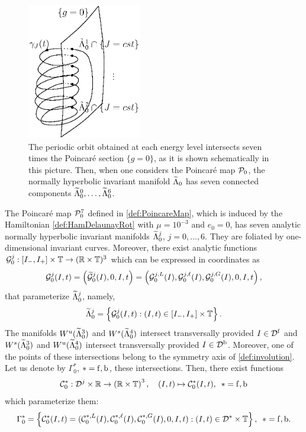 \begin{figure}[h]
  \begin{center}
    \includegraphics[width=5cm]{gammaJ.eps}
  \end{center}
  \caption{The periodic orbit obtained at each energy level intersects seven times the Poincar\'e section $\{g=0\}$, as it is shown schematically in this picture. Then, when one considers the Poincar\'e map $\mathcal{P}_0$, the normally hyperbolic invariant manifold $\widetilde\Lambda_0$ has seven connected components $\widetilde\Lambda^0_0, \ldots, \widetilde\Lambda_0^6$.}
  \label{fig:PoincareSection}
\end{figure}



\begin{corollary}\label{coro:NHIMCircular:Poincare}
  The Poincar\'e map $\mathcal{P}^7_0$ defined in \eqref{def:PoincareMap}, which is 
  induced by the Hamiltonian \eqref{def:HamDelaunayRot} with $\mu=10^{-3}$ 
  and  $e_0=0$, has seven analytic normally hyperbolic invariant manifolds
  $\widetilde\Lambda_0^j$, $j=0,\ldots,6$. They are foliated by one-dimensional 
  invariant curves. Moreover, there exist analytic functions 
  $\mathcal{G}^j_0: [I_-,I_+]\times\mathbb{T}\rightarrow (\mathbb{R} \times \mathbb{T})^3$ which can
  be expressed in coordinates as
  \begin{equation}\label{def:NHIM:Param0}
    \mathcal{G}_0^j(I,t)=\left(\widetilde
      {\mathcal{G}}_0^j(I),0,I,t\right)=\left(\mathcal{G}_0^{j,L}(I),\mathcal{G}_0^{j,\ell}(I),
      \mathcal{G}_0^{j,G}(I),0,I,t\right),
  \end{equation}
  that parameterize $\widetilde \Lambda_0^j$, namely,
  \[
  \widetilde\Lambda^j_0=\left\{ \mathcal{G}_0^j(I,t):(I,t)\in[I_-,I_+]\times \mathbb{T}\right\}.
  \]
  The manifolds $W^{u}(\widetilde\Lambda^3_0)$ and $W^{s}(\widetilde\Lambda^4_0)$ 
  intersect transversally  provided $I\in \mathcal{D}^{\mathrm{f}}$  and  $W^{s}(\widetilde\Lambda^3_0)$ 
  and $W^{u}(\widetilde\Lambda^4_0)$ intersect transversally provided $I\in \mathcal{D}^{\mathrm{b}}$. 
  Moreover, one of the points of these intersections belong to the symmetry axis 
  of \eqref{def:involution}. Let us denote by $\Gamma^{\ast}_0$, $\ast=\mathrm{f},\mathrm{b}$, these
  intersections. Then, there exist functions
  \[
  \mathcal{C}^{*}_0: \mathcal{D}^j\times\mathbb{R}\rightarrow
  \left(\mathbb{R}\times\mathbb{T}\right)^3, \quad (I,t) \mapsto \mathcal{C}^*_0(I,t),\,\,\,\ast=\mathrm{f},\mathrm{b}\]
  which parameterize them:
  \[
  \Gamma^*_0=\left\{ \mathcal{C}^*_0(I,t)=(\mathcal{C}_0^{*,L}(I),\mathcal{C}_0^{*,\ell}(I),
    \mathcal{C}_0^{*,G}(I),0,I,t):(I,t)\in \mathcal{D}^\ast\times\mathbb{T}\right\},\,\,\,\ast=\mathrm{f},\mathrm{b}.
  \]
\end{corollary}

